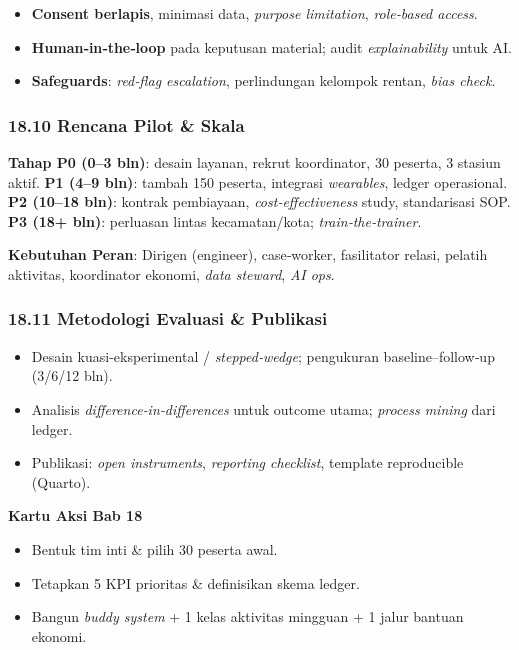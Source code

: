 \documentclass[
  letterpaper,
  DIV=11,
  numbers=noendperiod]{scrartcl}
\providecommand{\tightlist}{%
  \setlength{\itemsep}{0pt}\setlength{\parskip}{0pt}}
\begin{document}
\begin{itemize}
\tightlist
\item
  \textbf{Consent berlapis}, minimasi data, \emph{purpose limitation},
  \emph{role‑based access}.
\item
  \textbf{Human‑in‑the‑loop} pada keputusan material; audit
  \emph{explainability} untuk AI.
\item
  \textbf{Safeguards}: \emph{red‑flag escalation}, perlindungan kelompok
  rentan, \emph{bias check}.
\end{itemize}

\subsubsection{18.10 Rencana Pilot \& Skala}\label{rencana-pilot-skala}

\textbf{Tahap P0 (0--3 bln)}: desain layanan, rekrut koordinator, 30
peserta, 3 stasiun aktif. \textbf{P1 (4--9 bln)}: tambah 150 peserta,
integrasi \emph{wearables}, ledger operasional. \textbf{P2 (10--18
bln)}: kontrak pembiayaan, \emph{cost‑effectiveness} study, standarisasi
SOP. \textbf{P3 (18+ bln)}: perluasan lintas kecamatan/kota;
\emph{train‑the‑trainer}.

\textbf{Kebutuhan Peran}: Dirigen (engineer), case‑worker, fasilitator
relasi, pelatih aktivitas, koordinator ekonomi, \emph{data steward},
\emph{AI ops}.

\subsubsection{18.11 Metodologi Evaluasi \&
Publikasi}\label{metodologi-evaluasi-publikasi}

\begin{itemize}
\tightlist
\item
  Desain kuasi-eksperimental / \emph{stepped‑wedge}; pengukuran
  baseline--follow‑up (3/6/12 bln).
\item
  Analisis \emph{difference‑in‑differences} untuk outcome utama;
  \emph{process mining} dari ledger.
\item
  Publikasi: \emph{open instruments}, \emph{reporting checklist},
  template reproducible (Quarto).
\end{itemize}

\textbf{Kartu Aksi Bab 18}

\begin{itemize}
\tightlist
\item
  Bentuk tim inti \& pilih 30 peserta awal.
\item
  Tetapkan 5 KPI prioritas \& definisikan skema ledger.
\item
  Bangun \emph{buddy system} + 1 kelas aktivitas mingguan + 1 jalur
  bantuan ekonomi.
\end{itemize}
\end{document}
